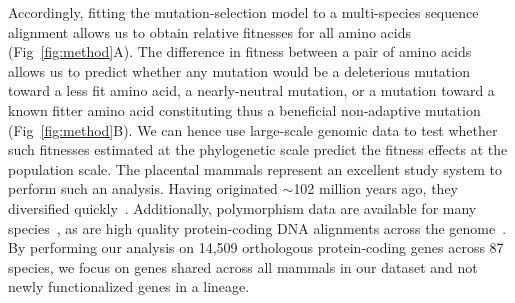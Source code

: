 \documentclass[10pt,letterpaper]{article}
\begin{document}
Accordingly, fitting the mutation-selection model to a multi-species sequence alignment allows us to obtain relative fitnesses for all amino acids (Fig~\ref{fig:method}A).
The difference in fitness between a pair of amino acids allows us to predict whether any mutation would be a deleterious mutation toward a less fit amino acid, a nearly-neutral mutation, or a mutation toward a known fitter amino acid constituting thus a beneficial non-adaptive mutation (Fig~\ref{fig:method}B).
We can hence use large-scale genomic data to test whether such fitnesses estimated at the phylogenetic scale predict the fitness effects at the population scale.
The placental mammals represent an excellent study system to perform such an analysis.
Having originated $\sim$102 million years ago, they diversified quickly~\cite{foley_genomic_2023}.
Additionally, polymorphism data are available for many species~\cite{howe_ensembl_2021}, as are high quality protein-coding DNA alignments across the genome~\cite{ranwez_orthomam_2007, scornavacca_orthomam_2019}.
By performing our analysis on 14,509 orthologous protein-coding genes across 87 species, we focus on genes shared across all mammals in our dataset and not newly functionalized genes in a lineage.
\end{document}
